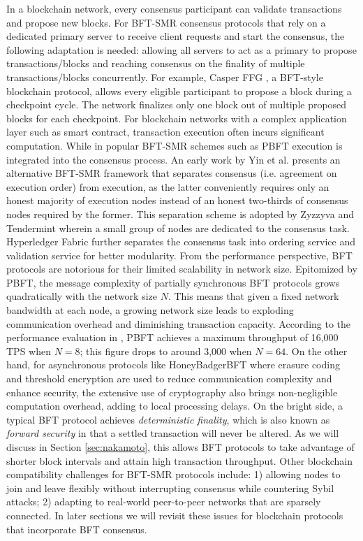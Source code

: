 In a blockchain network, every consensus participant can validate transactions and propose new blocks.
For BFT-SMR consensus protocols that rely on a dedicated primary server to receive client requests and start the consensus, the following adaptation is needed: allowing all servers to act as a primary to propose transactions/blocks and reaching consensus on the finality of multiple transactions/blocks concurrently. 
For example, Casper FFG , a BFT-style blockchain protocol, allows every eligible participant to propose a block during a checkpoint cycle. The network finalizes only one block out of multiple proposed blocks for each checkpoint.
{\color{\rcolor}
For blockchain networks with a complex application layer such as smart contract, transaction execution often incurs significant computation. While in popular BFT-SMR schemes such as PBFT execution is integrated into the consensus process. An early work by Yin et al.  presents an alternative BFT-SMR framework that separates consensus (i.e. agreement on execution order) from execution, as the latter conveniently requires only an honest majority of execution nodes instead of an honest two-thirds of consensus nodes required by the former. This separation scheme is adopted by Zyzzyva  and Tendermint  wherein a small group of nodes are dedicated to the consensus task. Hyperledger Fabric  further separates the consensus task into ordering service and validation service for better modularity.
}
From the performance perspective, BFT protocols are notorious for their limited scalability in network size.
Epitomized by PBFT, the message complexity of partially synchronous BFT protocols grows quadratically with the network size $N$. This means that given a fixed network bandwidth at each node, a growing network size leads to exploding communication overhead and diminishing transaction capacity. 
According to the performance evaluation in , PBFT achieves a maximum throughput of 16,000 TPS when $N=8$; this figure drops to around 3,000 when $N=64$. 
On the other hand, for asynchronous protocols like HoneyBadgerBFT where erasure coding and threshold encryption are used to reduce communication complexity and enhance security, the extensive use of cryptography also brings non-negligible computation overhead, adding to local processing delays.
On the bright side, a typical BFT protocol achieves \emph{deterministic finality}, which is also known as \emph{forward security}  in that a settled transaction will never be altered. As we will discuss in Section \ref{sec:nakamoto}, this allows BFT protocols to take advantage of shorter block intervals and attain high transaction throughput. 
Other blockchain compatibility challenges for BFT-SMR protocols include: 1) allowing nodes to join and leave flexibly without interrupting consensus while countering Sybil attacks; 2) adapting to real-world peer-to-peer networks that are sparsely connected. In later sections we will revisit these issues for blockchain protocols that incorporate BFT consensus.

